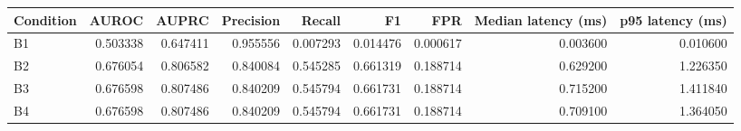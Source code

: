 \begin{tabular}{lrrrrrrrr}
\toprule
Condition & AUROC & AUPRC & Precision & Recall & F1 & FPR & Median latency (ms) & p95 latency (ms) \\
\midrule
B1 & 0.503338 & 0.647411 & 0.955556 & 0.007293 & 0.014476 & 0.000617 & 0.003600 & 0.010600 \\
B2 & 0.676054 & 0.806582 & 0.840084 & 0.545285 & 0.661319 & 0.188714 & 0.629200 & 1.226350 \\
B3 & 0.676598 & 0.807486 & 0.840209 & 0.545794 & 0.661731 & 0.188714 & 0.715200 & 1.411840 \\
B4 & 0.676598 & 0.807486 & 0.840209 & 0.545794 & 0.661731 & 0.188714 & 0.709100 & 1.364050 \\
\bottomrule
\end{tabular}
